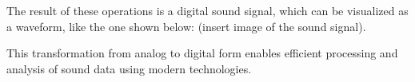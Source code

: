 The result of these operations is a digital sound signal, which can be visualized as a waveform, like the one shown
below: (insert image of the sound signal).


This transformation from analog to digital form enables efficient processing and analysis of sound data using modern
technologies.


%
%
%

